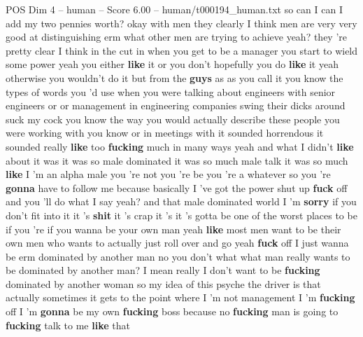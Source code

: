 \begin{textsample}{POS Dim 4 – human – Score 6.00 – human/t000194\_human.txt}  \label{ex:f4_pos_001}
so can I can I add my two pennies worth? okay with men they clearly I think men are very very good at distinguishing erm what other men are trying to achieve yeah? they 're pretty clear I think in the cut in when you get to be a manager you start to wield some power yeah you either \textbf{like} it or you don't hopefully you do \textbf{like} it yeah otherwise you wouldn't do it but from the \textbf{guys} as as you call it you know the types of words you 'd use when you were talking about engineers with senior engineers or or management in engineering companies swing their dicks around suck my cock you know the way you would actually describe these people you were working with you know or in meetings with it sounded horrendous it sounded really \textbf{like} too \textbf{fucking} much in many ways yeah and what I didn't \textbf{like} about it was it was so male dominated it was so much male talk it was so much \textbf{like} I 'm an alpha male you 're not you 're be you 're a whatever so you 're \textbf{gonna} have to follow me because basically I 've got the power shut up \textbf{fuck} off and you 'll do what I say yeah? and that male dominated world I 'm \textbf{sorry} if you don't fit into it it 's \textbf{shit} it 's crap it 's it 's gotta be one of the worst places to be if you 're if you wanna be your own man yeah \textbf{like} most men want to be their own men who wants to actually just roll over and go yeah \textbf{fuck} off I just wanna be erm dominated by another man no you don't what what man really wants to be dominated by another man?
I mean really I don't want to be \textbf{fucking} dominated by another woman so my idea of this psyche the driver is that actually sometimes it gets to the point where I 'm not management I 'm \textbf{fucking} off I 'm \textbf{gonna} be my own \textbf{fucking} boss because no \textbf{fucking} man is going to \textbf{fucking} talk to me \textbf{like} that

\end{textsample}
